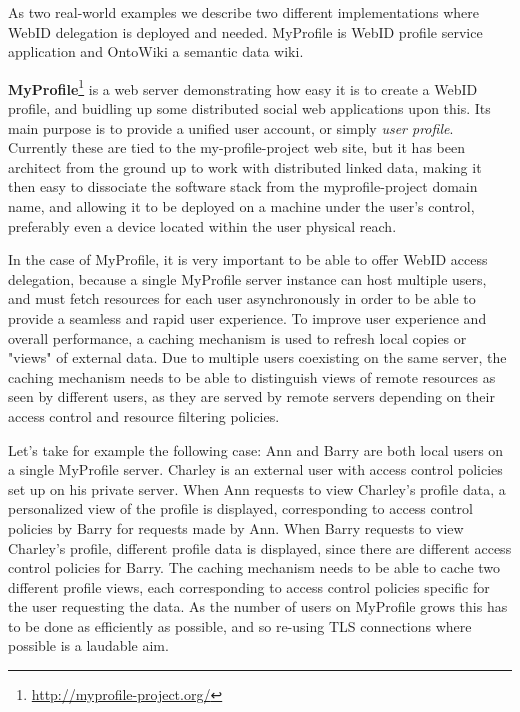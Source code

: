 \documentclass[a4paper]{llncs}
\begin{document}
As two real-world examples we describe two different implementations where WebID delegation is deployed and needed.
MyProfile is WebID profile service application and OntoWiki a semantic data wiki.

\textbf{MyProfile}\footnote{\url{http://myprofile-project.org/}}
is a web server demonstrating how easy it is to create a WebID profile, and buidling up some distributed social web applications upon this.
Its main purpose is to provide a unified user account, or simply \textit{user profile}.
Currently these are tied to the my-profile-project web site, but it has been architect from the ground up to work with distributed linked data, making it then easy to dissociate the software stack from the myprofile-project domain name, and allowing it to be deployed on a machine under the user's control, preferably even a device located within the user physical reach.


In the case of MyProfile, it is very important to be able to offer WebID access delegation, because a single MyProfile server instance can host multiple users, and must fetch resources for each user asynchronously in order to be able to provide a seamless and rapid user experience.
To improve user experience and overall performance, a caching mechanism is used to refresh local copies or "views" of external data.
Due to multiple users coexisting on the same server, the caching mechanism needs to be able to distinguish views of remote resources as seen by different users, as they are served by remote servers depending on their access control and resource filtering policies.

Let's take for example the following case:
Ann and Barry are both local users on a single MyProfile server.
Charley is an external user with access control policies set up on his private server.
When Ann requests to view Charley's profile data, a personalized view of the profile is displayed, corresponding to access control policies by Barry for requests made by Ann.
When Barry requests to view Charley's profile, different profile data is displayed, since there are different access control policies for Barry.
The caching mechanism needs to be able to cache two different profile views, each corresponding to access control policies specific for the user requesting the data.
As the number of users on MyProfile grows this has to be done as efficiently as possible, and so re-using TLS connections where possible is a laudable aim.
\end{document}
